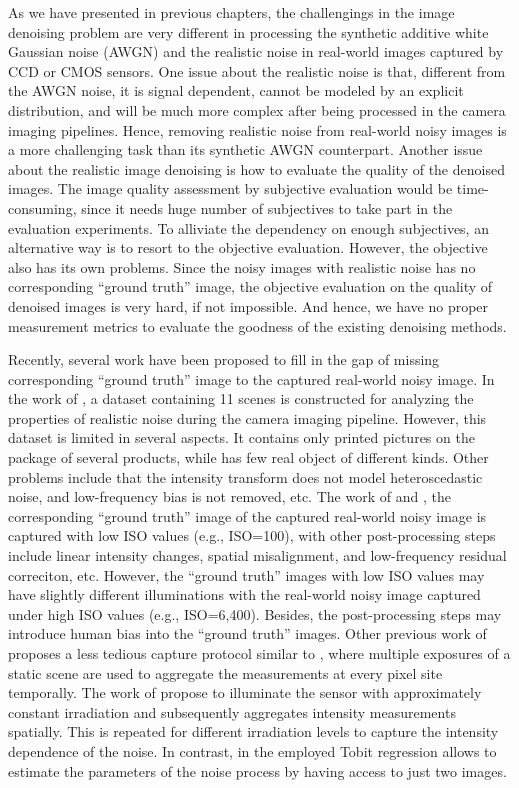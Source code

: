 As we have presented in previous chapters, the challengings in the image denoising problem are very different in processing the synthetic additive white Gaussian noise (AWGN) and the realistic noise in real-world images captured by CCD or CMOS sensors. One issue about the realistic noise is that, different from the AWGN noise, it is signal dependent, cannot be modeled by an explicit distribution, and will be much more complex after being processed in the camera imaging pipelines. Hence, removing realistic noise from real-world noisy images is a more challenging task than its synthetic AWGN counterpart. Another issue about the realistic image denoising is how to evaluate the quality of the denoised images. The image quality assessment by subjective evaluation would be time-consuming, since it needs huge number of subjectives to take part in the evaluation experiments. To alliviate the dependency on enough subjectives, an alternative way is to resort to the objective evaluation. However, the objective also has its own problems. Since the noisy images with realistic noise has no corresponding ``ground truth'' image, the objective evaluation on the quality of denoised images is very hard, if not impossible. And hence, we have no proper measurement metrics to evaluate the goodness of the existing denoising methods.

Recently, several work have been proposed to fill in the gap of missing corresponding ``ground truth'' image to the captured real-world noisy image. In the work of \cite{crosschannel2016}, a dataset containing 11 scenes is constructed for analyzing the properties of realistic noise during the camera imaging pipeline. However, this dataset is limited in several aspects. It contains only printed pictures on the package of several products, while has few real object of different kinds. Other problems include that the intensity transform does not model heteroscedastic noise, and low-frequency bias is not removed, etc. The work of \cite{RENOIR2014} and \cite{dnd2017}, the corresponding ``ground truth'' image of the captured real-world noisy image is captured with low ISO values (e.g., ISO=100), with other post-processing steps include linear intensity changes, spatial misalignment, and low-frequency residual correciton, etc. However, the ``ground truth'' images with low ISO values may have slightly different illuminations with the real-world noisy image captured under high ISO values (e.g., ISO=6,400). Besides, the post-processing steps may introduce human bias into the ``ground truth'' images. Other previous work of \cite{EMVA1288} proposes a less tedious capture protocol similar to \cite{dnd2017}, where multiple exposures of a static scene are used to aggregate the measurements at every pixel site temporally. The work of \cite{noisemeasurement,moldovan2006denoising} propose to illuminate the sensor with approximately constant irradiation and subsequently aggregates intensity measurements spatially. This is repeated for different irradiation levels to capture the intensity dependence of the noise. In contrast, in \cite{dnd2017} the employed Tobit regression allows to estimate the parameters of the noise process by having access to just two images.

